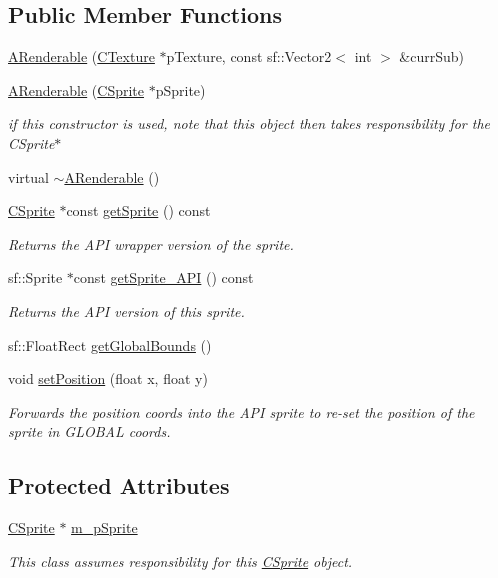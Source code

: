 \subsection*{Public Member Functions}
\begin{DoxyCompactItemize}
\item 
\hyperlink{classARenderable_a945fecfa1012fc94f186b8814f225ae8}{A\-Renderable} (\hyperlink{classCTexture}{C\-Texture} $\ast$p\-Texture, const sf\-::\-Vector2$<$ int $>$ \&curr\-Sub)
\item 
\hyperlink{classARenderable_a3d575592900ff1796452f35e7c618e6d}{A\-Renderable} (\hyperlink{classCSprite}{C\-Sprite} $\ast$p\-Sprite)
\begin{DoxyCompactList}\small\item\em if this constructor is used, note that this object then takes responsibility for the C\-Sprite$\ast$ \end{DoxyCompactList}\item 
virtual \hyperlink{classARenderable_a4242e972db0272afa33bbb60cb783132}{$\sim$\-A\-Renderable} ()
\item 
\hyperlink{classCSprite}{C\-Sprite} $\ast$const \hyperlink{classARenderable_a2fc0c24af527998d4d1a891ede342b8b}{get\-Sprite} () const 
\begin{DoxyCompactList}\small\item\em Returns the A\-P\-I wrapper version of the sprite. \end{DoxyCompactList}\item 
sf\-::\-Sprite $\ast$const \hyperlink{classARenderable_a87845b6d223c0f8907b465cdcf48311d}{get\-Sprite\-\_\-\-A\-P\-I} () const 
\begin{DoxyCompactList}\small\item\em Returns the A\-P\-I version of this sprite. \end{DoxyCompactList}\item 
sf\-::\-Float\-Rect \hyperlink{classARenderable_a77d3d8b9f8d7f0e8b860abba2f6c53c9}{get\-Global\-Bounds} ()
\item 
void \hyperlink{classARenderable_a1d0db7e6ba2e9bf6d8accb4164531b46}{set\-Position} (float x, float y)
\begin{DoxyCompactList}\small\item\em Forwards the position coords into the A\-P\-I sprite to re-\/set the position of the sprite in G\-L\-O\-B\-A\-L coords. \end{DoxyCompactList}\end{DoxyCompactItemize}
\subsection*{Protected Attributes}
\begin{DoxyCompactItemize}
\item 
\hyperlink{classCSprite}{C\-Sprite} $\ast$ \hyperlink{classARenderable_a6030df923c81b400e94ff1f6a9df41f8}{m\-\_\-p\-Sprite}
\begin{DoxyCompactList}\small\item\em This class assumes responsibility for this \hyperlink{classCSprite}{C\-Sprite} object. \end{DoxyCompactList}\end{DoxyCompactItemize}



